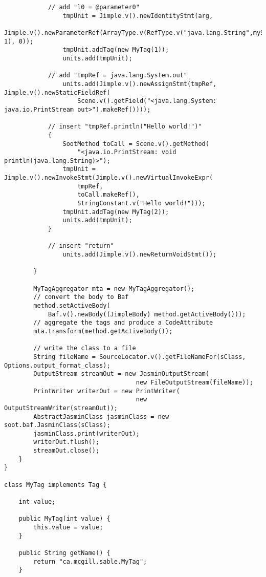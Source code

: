 \documentclass{article}
\begin{document}
\begin{verbatim}
            // add "l0 = @parameter0"
                tmpUnit = Jimple.v().newIdentityStmt(arg, 
                     Jimple.v().newParameterRef(ArrayType.v(RefType.v("java.lang.String",myScene), 1), 0));
                tmpUnit.addTag(new MyTag(1));
                units.add(tmpUnit);
            
            // add "tmpRef = java.lang.System.out"
                units.add(Jimple.v().newAssignStmt(tmpRef, Jimple.v().newStaticFieldRef(
                    Scene.v().getField("<java.lang.System: java.io.PrintStream out>").makeRef())));
            
            // insert "tmpRef.println("Hello world!")"
            {
                SootMethod toCall = Scene.v().getMethod(
                    "<java.io.PrintStream: void println(java.lang.String)>");
                tmpUnit = Jimple.v().newInvokeStmt(Jimple.v().newVirtualInvokeExpr(
                    tmpRef, 
                    toCall.makeRef(),
                    StringConstant.v("Hello world!")));
                tmpUnit.addTag(new MyTag(2));
                units.add(tmpUnit);
            }
            
            // insert "return"
                units.add(Jimple.v().newReturnVoidStmt());
                     
        }

        MyTagAggregator mta = new MyTagAggregator();
        // convert the body to Baf
        method.setActiveBody(
            Baf.v().newBody((JimpleBody) method.getActiveBody()));
        // aggregate the tags and produce a CodeAttribute
        mta.transform(method.getActiveBody());

        // write the class to a file
        String fileName = SourceLocator.v().getFileNameFor(sClass, Options.output_format_class);
        OutputStream streamOut = new JasminOutputStream(
                                    new FileOutputStream(fileName));
        PrintWriter writerOut = new PrintWriter(
                                    new OutputStreamWriter(streamOut));
        AbstractJasminClass jasminClass = new soot.baf.JasminClass(sClass);
        jasminClass.print(writerOut);
        writerOut.flush();
        streamOut.close();
    }
}

class MyTag implements Tag {
        
    int value;

    public MyTag(int value) {
        this.value = value;
    }

    public String getName() {
        return "ca.mcgill.sable.MyTag";
    }


\end{verbatim}
\end{document}
